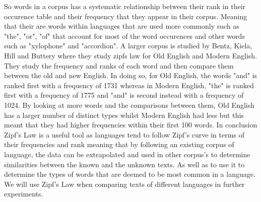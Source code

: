 So words in a corpus has a systematic relationship between their rank in their occurence table and their frequency that they appear in their corpus. Meaning that their are words within languages that are used more commonly such as "the", "or", "of" that account for most of the word occurences and other words such as "xylophone" and "accordion". A larger corpus is studied by Bentz, Kiela, Hill and Buttery \cite{BentzKielaHillButtery} where they study zipfs law for Old English and Modern English. They study the frequency and ranks of each word and then compare them between the old and new English. In doing so, for Old English, the words "and" is ranked first with a frequency of 1731 whereas in Modern English, "the" is ranked first with a frequency of 1775 and "and" is second instead with a frequency of 1024. By looking at more words and the comparisons between them, Old English has a larger number of distinct types whilst Modern English had less but this meant that they had higher frequencies within their first 100 words.
In conclusion Zipf's Law is a useful tool as languages tend to follow Zipf's curve in terms of their frequencies and rank meaning that by following an existing corpus of language, the data can be extrapolated and used in other corpus's to determine similarities between the known and the unknown texts. As well as to use it to determine the types of words that are deemed to be most common in a language. We will use Zipf's Law when comparing texts of different languages in further experiments. 